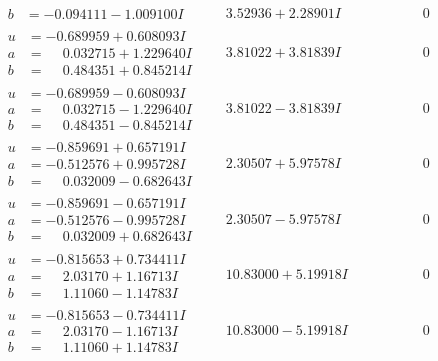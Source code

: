 \documentclass[1p]{elsarticle_modified}
\theoremstyle{definition}
\begin{document}
$$\begin{array}{c|c|c}
\begin{aligned}
b &= -0.094111 - 1.009100 I\end{aligned}
 & \phantom{-}3.52936 + 2.28901 I & \phantom{-0.000000 } 0 \\ \hline\begin{aligned}
u &= -0.689959 + 0.608093 I \\
a &= \phantom{-}0.032715 + 1.229640 I \\
b &= \phantom{-}0.484351 + 0.845214 I\end{aligned}
 & \phantom{-}3.81022 + 3.81839 I & \phantom{-0.000000 } 0 \\ \hline\begin{aligned}
u &= -0.689959 - 0.608093 I \\
a &= \phantom{-}0.032715 - 1.229640 I \\
b &= \phantom{-}0.484351 - 0.845214 I\end{aligned}
 & \phantom{-}3.81022 - 3.81839 I & \phantom{-0.000000 } 0 \\ \hline\begin{aligned}
u &= -0.859691 + 0.657191 I \\
a &= -0.512576 + 0.995728 I \\
b &= \phantom{-}0.032009 - 0.682643 I\end{aligned}
 & \phantom{-}2.30507 + 5.97578 I & \phantom{-0.000000 } 0 \\ \hline\begin{aligned}
u &= -0.859691 - 0.657191 I \\
a &= -0.512576 - 0.995728 I \\
b &= \phantom{-}0.032009 + 0.682643 I\end{aligned}
 & \phantom{-}2.30507 - 5.97578 I & \phantom{-0.000000 } 0 \\ \hline\begin{aligned}
u &= -0.815653 + 0.734411 I \\
a &= \phantom{-}2.03170 + 1.16713 I \\
b &= \phantom{-}1.11060 - 1.14783 I\end{aligned}
 & \phantom{-}10.83000 + 5.19918 I & \phantom{-0.000000 } 0 \\ \hline\begin{aligned}
u &= -0.815653 - 0.734411 I \\
a &= \phantom{-}2.03170 - 1.16713 I \\
b &= \phantom{-}1.11060 + 1.14783 I\end{aligned}
 & \phantom{-}10.83000 - 5.19918 I & \phantom{-0.000000 } 0 \\ \hline\begin{aligned}

\end{aligned}
\end{array}$$
\end{document}
